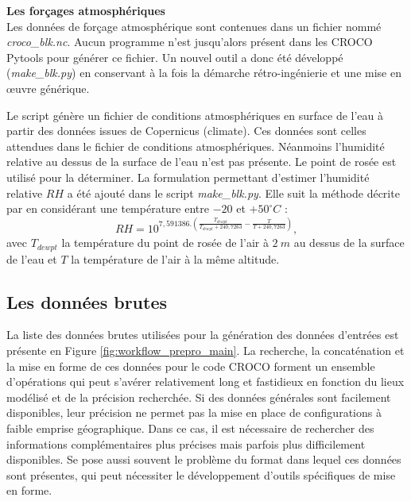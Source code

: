 \documentclass[10pt,a4paper,titlepage]{article}
\begin{document}
\textbf{Les forçages atmosphériques}\\
Les données de forçage atmosphérique sont contenues dans un fichier nommé \textit{croco\_blk.nc}.
Aucun programme n'est jusqu'alors présent dans les CROCO Pytools pour générer ce fichier.
Un nouvel outil a donc été développé (\textit{make\_blk.py}) en conservant à la fois la démarche rétro-ingénierie et une mise en \oe{}uvre générique.

Le script génère un fichier de conditions atmosphériques en surface de l'eau à partir des données issues de Copernicus (climate).
Ces données sont celles attendues dans le fichier de conditions atmosphériques.
Néanmoins l'humidité relative au dessus de la surface de l'eau n'est pas présente.
Le point de rosée est utilisé pour la déterminer.
La formulation permettant d'estimer l'humidité relative $RH$ a été ajouté dans le script \textit{make\_blk.py}.
Elle suit la méthode décrite par \cite{humidity_formulation} en considérant une température entre $-20$ et $+50 ^\circ C$ :
$$RH = 10^{7,591386.(\frac{T_{dewpt}}{T_{dewpt}+240,7263}-\frac{T}{T+240,7263})},$$
avec $T_{dewpt}$ la température du point de rosée de l'air à $2~m$ au dessus de la surface de l'eau et $T$ la température de l'air à la même altitude.

\subsection{Les données brutes}
\label{sub:donnes_brutes}

La liste des données brutes utilisées pour la génération des données d'entrées est présente en Figure \ref{fig:workflow_prepro_main}.
La recherche, la concaténation et la mise en forme de ces données pour le code CROCO forment un ensemble d'opérations qui peut s'avérer relativement long et fastidieux en fonction du lieux modélisé et de la précision recherchée.
Si des données générales sont facilement disponibles, leur précision ne permet pas la mise en place de configurations à faible emprise géographique.
Dans ce cas, il est nécessaire de rechercher des informations complémentaires plus précises mais parfois plus difficilement disponibles.
Se pose aussi souvent le problème du format dans lequel ces données sont présentes, qui peut nécessiter le développement d'outils spécifiques de mise en forme.
\end{document}

